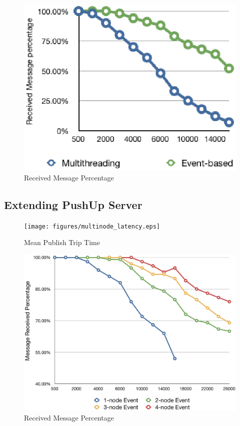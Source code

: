 \begin{figure}[htb!]
\centering%
    \includegraphics[scale=0.70]{figures/et_rate.eps}
    \caption{Received Message Percentage}
    \label{fig:et_rate}
\end{figure}


\subsection{Extending PushUp Server\\}

\begin{figure}[htb!]
\centering%
    \texttt{[image: figures/multinode\_latency.eps]}
    \caption{Mean Publish Trip Time}
    \label{fig:mt_latency}
\end{figure}

\begin{figure}[htb!]
\centering%
    \includegraphics[scale=0.28]{figures/multinode_rate.eps}
    \caption{Received Message Percentage}
    \label{fig:mt_rate}
\end{figure}

